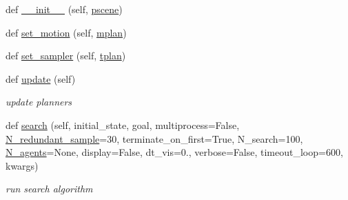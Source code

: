 \begin{DoxyCompactItemize}
\item 
def \hyperlink{classrnb-planning_1_1src_1_1pkg_1_1planning_1_1pipeline_1_1_planning_pipeline_aef988f144e15656ea5853680ccbe87af}{\+\_\+\+\_\+init\+\_\+\+\_\+} (self, \hyperlink{classrnb-planning_1_1src_1_1pkg_1_1planning_1_1pipeline_1_1_planning_pipeline_aeaa04fa8834b7331df19710409fe150f}{pscene})
\item 
def \hyperlink{classrnb-planning_1_1src_1_1pkg_1_1planning_1_1pipeline_1_1_planning_pipeline_ab56b8743b410e9dee8c7643b879e1f52}{set\+\_\+motion} (self, \hyperlink{classrnb-planning_1_1src_1_1pkg_1_1planning_1_1pipeline_1_1_planning_pipeline_a6d67bd678238c66dccb6fcf9ca38f105}{mplan})
\item 
def \hyperlink{classrnb-planning_1_1src_1_1pkg_1_1planning_1_1pipeline_1_1_planning_pipeline_a054a0d7395e4b63071c5dc751895d32f}{set\+\_\+sampler} (self, \hyperlink{classrnb-planning_1_1src_1_1pkg_1_1planning_1_1pipeline_1_1_planning_pipeline_ab61c6f341f85f419dd17f0cde8cfed81}{tplan})
\item 
\mbox{\label{classrnb-planning_1_1src_1_1pkg_1_1planning_1_1pipeline_1_1_planning_pipeline_a1cd099f101af7824fffb6ca0f3da2e67}} 
def \hyperlink{classrnb-planning_1_1src_1_1pkg_1_1planning_1_1pipeline_1_1_planning_pipeline_a1cd099f101af7824fffb6ca0f3da2e67}{update} (self)
\begin{DoxyCompactList}\small\item\em update planners \end{DoxyCompactList}\item 
def \hyperlink{classrnb-planning_1_1src_1_1pkg_1_1planning_1_1pipeline_1_1_planning_pipeline_ad767704963c5571db51a67f0c25a566f}{search} (self, initial\+\_\+state, goal, multiprocess=False, \hyperlink{classrnb-planning_1_1src_1_1pkg_1_1planning_1_1pipeline_1_1_planning_pipeline_a3bf51b1b132602d1b05e5b30303c7556}{N\+\_\+redundant\+\_\+sample}=30, terminate\+\_\+on\+\_\+first=True, N\+\_\+search=100, \hyperlink{classrnb-planning_1_1src_1_1pkg_1_1planning_1_1pipeline_1_1_planning_pipeline_a9c9a7a0cb5d8b208530b0965c1e64ca5}{N\+\_\+agents}=None, display=False, dt\+\_\+vis=0., verbose=False, timeout\+\_\+loop=600, kwargs)
\begin{DoxyCompactList}\small\item\em run search algorithm \end{DoxyCompactList}\item 

\end{DoxyCompactItemize}
